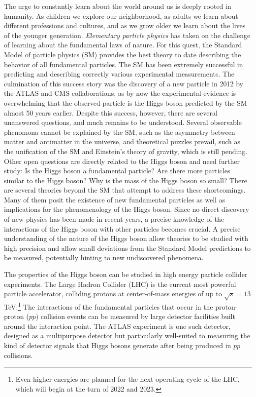 
The urge to constantly learn about the world around us is deeply rooted in humanity.
As children we explore our neighborhood, as adults we learn about different professions and cultures, and as we grow older we learn about the lives of the younger generation. 
\emph{Elementary particle physics} has taken on the challenge of learning about the fundamental laws of nature. 
For this quest, the Standard Model of particle physics (SM) provides the best theory to date describing the behavior of all fundamental particles. 
The SM has been extremely successful in predicting and describing correctly various experimental measurements. 
The culmination of this success story was the discovery of a new particle in 2012 by the ATLAS and CMS collaborations, as by now the experimental evidence is overwhelming that the observed particle is the Higgs boson predicted by the SM almost 50 years earlier. 
Despite this success, however, there are several unanswered questions, and much remains to be understood. 
Several observable phenomona cannot be explained by the SM, such as the asymmetry between matter and antimatter in the universe, and theoretical puzzles prevail, such as the unification of the SM and Einstein's theory of gravity, which is still pending.
Other open questions are directly related to the Higgs boson and need further study: Is the Higgs boson a fundamental particle? Are there more particles similar to the Higgs boson? Why is the mass of the Higgs boson so small? 
There are several theories beyond the SM that attempt to address these shortcomings. 
Many of them posit the existence of new fundamental particles as well as implications for the phenomenology of the Higgs boson.
Since no direct discovery of new physics has been made in recent years, a precise knowledge of the interactions of the Higgs boson with other particles becomes crucial. 
A precise understanding of the nature of the Higgs boson allow theories to be studied with high precision and allow small deviations from the Standard Model predictions to be measured, potentially hinting to new undiscovered phenomena.

The properties of the Higgs boson can be studied in high energy particle collider experiments. 
The Large Hadron Collider (LHC) is the current most powerful particle accelerator, colliding protons at center-of-mass energies of up to $\sqrt{s} = 13\,$TeV.\footnote{Even higher energies are planned for the next operating cycle of the LHC, which will begin at the turn of 2022 and 2023.}
The interactions of the fundamental particles that occur in the proton-proton ($pp$) collision events can be measured by large detector facilities built around the interaction point. 
The ATLAS experiment is one such detector, designed as a multipurpose detector but particularly well-suited to measuring the kind of detector signals that Higgs bosons generate after being produced in $pp$ collisions.

